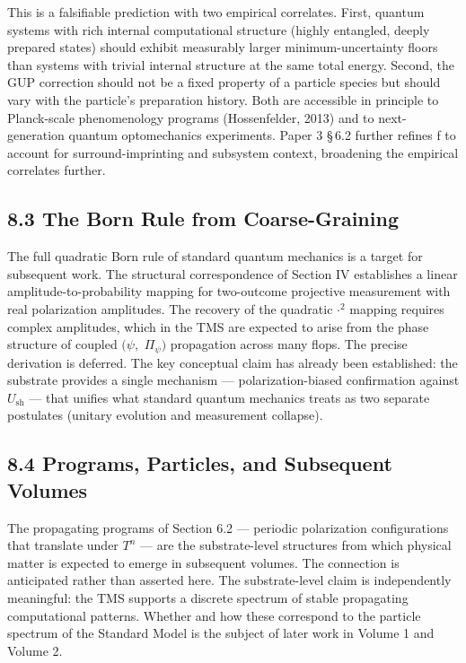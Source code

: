 \documentclass[11pt,oneside]{report}
\theoremstyle{definition}
\theoremstyle{remark}
\begin{document}
This is a falsifiable prediction with two empirical correlates. First,
quantum systems with rich internal computational structure (highly
entangled, deeply prepared states) should exhibit measurably larger
minimum-uncertainty floors than systems with trivial internal structure
at the same total energy. Second, the GUP correction should not be a
fixed property of a particle species but should vary with the particle's
preparation history. Both are accessible in principle to Planck-scale
phenomenology programs (Hossenfelder, 2013) and to next-generation
quantum optomechanics experiments. Paper 3 \S\,6.2 further refines f to
account for surround-imprinting and subsystem context, broadening the
empirical correlates further.

\subsection*{8.3 The Born Rule from Coarse-Graining}

The full quadratic Born rule of standard quantum mechanics is a target
for subsequent work. The structural correspondence of Section IV
establishes a linear amplitude-to-probability mapping for two-outcome
projective measurement with real polarization amplitudes. The recovery
of the quadratic \textbar\ensuremath{\cdot}\textbar\ensuremath{^{2}} mapping requires complex amplitudes,
which in the TMS are expected to arise from the phase structure of
coupled \ensuremath{(\psi ,} \ensuremath{\Pi_{\psi})} propagation across many flops. The precise derivation
is deferred. The key conceptual claim has already been established: the
substrate provides a single mechanism --- polarization-biased
confirmation against \ensuremath{U_{\mathrm{sh}}} --- that unifies what standard quantum
mechanics treats as two separate postulates (unitary evolution and
measurement collapse).

\subsection*{8.4 Programs, Particles, and Subsequent Volumes}

The propagating programs of Section 6.2 --- periodic polarization
configurations that translate under \ensuremath{T^{n}} --- are the substrate-level
structures from which physical matter is expected to emerge in
subsequent volumes. The connection is anticipated rather than asserted
here. The substrate-level claim is independently meaningful: the TMS
supports a discrete spectrum of stable propagating computational
patterns. Whether and how these correspond to the particle spectrum of
the Standard Model is the subject of later work in Volume 1 and Volume
2.
\end{document}
